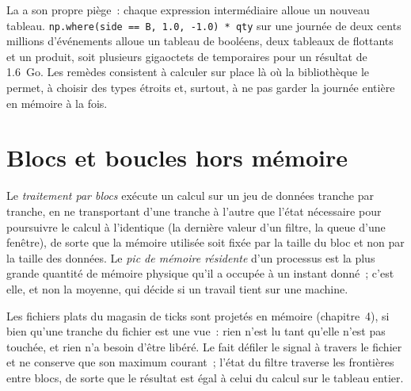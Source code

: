 \begin{remark}[Copies]\label{rem:pl:python-at-scale:copies}
La  a son propre piège~: chaque expression intermédiaire alloue un nouveau tableau.
\texttt{np.where(side == B, 1.0, -1.0) * qty} sur une journée de deux cents millions d'événements alloue un tableau de booléens, deux tableaux de flottants et un produit, soit plusieurs gigaoctets de
temporaires pour un résultat de 1.6~Go. Les remèdes consistent à calculer sur place là où la bibliothèque le permet, à choisir des types étroits et,
surtout, à ne pas garder la journée entière en mémoire à la fois.
\end{remark}

\section{Blocs et boucles hors mémoire}

\begin{definition}\label{def:pl:python-at-scale:chunked}
Le \emph{traitement par blocs} exécute un calcul sur un jeu de données tranche par tranche, en ne transportant d'une tranche à l'autre
que l'état nécessaire pour poursuivre le calcul à l'identique (la dernière valeur d'un filtre, la queue d'une fenêtre), de sorte que la mémoire utilisée
soit fixée par la taille du bloc et non par la taille des données. Le \emph{pic de mémoire résidente} d'un processus est
la plus grande quantité de mémoire physique qu'il a occupée à un instant donné~; c'est elle, et non la moyenne, qui décide si un travail tient sur une machine.
\end{definition}

Les fichiers plats du magasin de ticks sont projetés en mémoire (chapitre~4), si bien qu'une tranche du fichier est une vue~: rien n'est lu tant qu'elle n'est pas touchée,
et rien n'a besoin d'être libéré. Le  fait défiler le signal à travers le fichier et ne conserve que son
maximum courant~; l'état du filtre traverse les frontières entre blocs, de sorte que le résultat est égal à celui du calcul sur le tableau entier.

\label{lst:pl:python-at-scale:stream}

